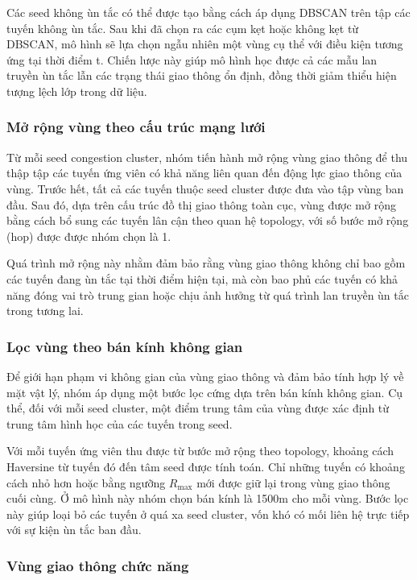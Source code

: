 Các seed không ùn tắc có thể được tạo bằng cách áp dụng DBSCAN trên tập các tuyến không
ùn tắc. Sau khi đã chọn ra các cụm kẹt hoặc không kẹt từ DBSCAN, mô hình sẽ lựa chọn ngẫu nhiên một vùng cụ thể với điều kiện
tương ứng tại thời điểm t. Chiến lược này giúp mô hình học được cả các
mẫu lan truyền ùn tắc lẫn các trạng thái giao thông ổn định, đồng thời giảm thiểu hiện tượng
lệch lớp trong dữ liệu.

\subsubsection{Mở rộng vùng theo cấu trúc mạng lưới}
\label{subsubsec:graph_expansion}

Từ mỗi seed congestion cluster, nhóm tiến hành mở rộng vùng giao thông để thu thập
tập các tuyến ứng viên có khả năng liên quan đến động lực giao thông của vùng. Trước hết,
tất cả các tuyến thuộc seed cluster được đưa vào tập vùng ban đầu. Sau đó, dựa trên cấu trúc
đồ thị giao thông toàn cục, vùng được mở rộng bằng cách bổ sung các tuyến lân cận theo quan
hệ topology, với số bước mở rộng (hop) được được nhóm chọn là 1.

Quá trình mở rộng này nhằm đảm bảo rằng vùng giao thông không chỉ bao gồm các tuyến đang
ùn tắc tại thời điểm hiện tại, mà còn bao phủ các tuyến có khả năng đóng vai trò trung gian
hoặc chịu ảnh hưởng từ quá trình lan truyền ùn tắc trong tương lai.

\subsubsection{Lọc vùng theo bán kính không gian}
\label{subsubsec:radius_filter}

Để giới hạn phạm vi không gian của vùng giao thông và đảm bảo tính hợp lý về mặt vật lý,
nhóm áp dụng một bước lọc cứng dựa trên bán kính không gian. Cụ thể, đối với mỗi seed
cluster, một điểm trung tâm của vùng được xác định từ trung tâm hình học của các tuyến
trong seed.

Với mỗi tuyến ứng viên thu được từ bước mở rộng theo topology, khoảng cách Haversine từ
tuyến đó đến tâm seed được tính toán. Chỉ những tuyến có khoảng cách nhỏ hơn hoặc bằng
ngưỡng $R_{\max}$ mới được giữ lại trong vùng giao thông cuối cùng. Ở mô hình này nhóm chọn bán kính là 1500m cho mỗi vùng. Bước lọc này giúp loại
bỏ các tuyến ở quá xa seed cluster, vốn khó có mối liên hệ trực tiếp với sự kiện ùn tắc ban đầu.

\subsubsection{Vùng giao thông chức năng}
\label{subsubsec:functional_zone}

